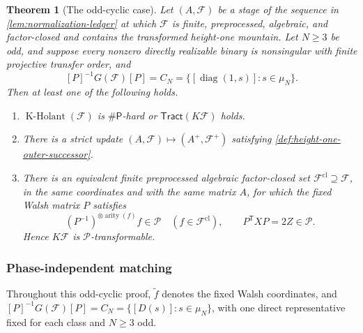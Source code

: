 \documentclass[11pt,letterpaper,onecolumn]{article}
\theoremstyle{plain}
\newtheorem{theorem}{Theorem}[section]
\theoremstyle{definition}
\theoremstyle{remark}
\newcommand{\cF}{\mathcal F}
\newcommand{\cP}{\mathscr P}
\newcommand{\KHolant}{\operatorname{K\text{-}Holant}}
\newcommand{\Tract}{\mathsf{Tract}}
\newcommand{\SharpP}{\#\mathsf P}
\newcommand{\diag}{\operatorname{diag}}
\newcommand{\arity}{\operatorname{arity}}
\begin{document}
	\begin{theorem}[The odd-cyclic case]
		\label{thm:odd-cyclic}
		Let \((A,\cF)\) be a stage of the sequence in
		\cref{lem:normalization-ledger} at which \(\cF\) is finite, preprocessed,
		algebraic, and factor-closed and contains the transformed height-one
		mountain.  Let \(N\ge3\) be odd, and suppose every nonzero directly
		realizable binary is nonsingular with finite projective transfer order, and
		\[
		[P]^{-1}G(\cF)[P]
		=C_N=\{[\diag(1,s)]:s\in\mu_N\}.
		\]
		Then at least one of the following holds.
		\begin{enumerate}
			\item \(\KHolant(\cF)\) is \(\SharpP\)-hard or \(\Tract(K\cF)\) holds.
            \item There is a strict update \((A,\cF)\mapsto(A^+,\cF^+)\)
            satisfying \cref{def:height-one-outer-successor}.
			\item There is an equivalent finite preprocessed algebraic factor-closed
			set \(\cF^{\mathrm{cl}}\supseteq\cF\), in the same
			coordinates and with the same matrix \(A\), for which the fixed
			Walsh matrix \(P\) satisfies
			\[
			(P^{-1})^{\otimes\arity(f)}f\in\cP
			\quad(f\in\cF^{\mathrm{cl}}),
			\qquad
			P^{\mathsf T}XP=2Z\in\cP.
			\]
			Hence \(K\cF\) is \(\cP\)-transformable.
		\end{enumerate}
	\end{theorem}
	
	\subsubsection{Phase-independent matching}
	\label{subsec:odd-cyc-pencil}
	
	Throughout this odd-cyclic proof, \(\widetilde f\) denotes the fixed
	Walsh coordinates, and
	\([P]^{-1}G(\cF)[P]=C_N=\{[D(s)]:s\in\mu_N\}\), with one direct representative fixed for
	each class and \(N\ge3\) odd.
	
\end{document}
